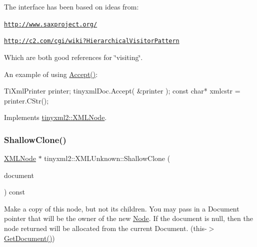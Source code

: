 The interface has been based on ideas from\+:


\begin{DoxyItemize}
\item \href{http://www.saxproject.org/}{\tt http\+://www.\+saxproject.\+org/}
\item \href{http://c2.com/cgi/wiki?HierarchicalVisitorPattern}{\tt http\+://c2.\+com/cgi/wiki?\+Hierarchical\+Visitor\+Pattern}
\end{DoxyItemize}

Which are both good references for \char`\"{}visiting\char`\"{}.

An example of using \hyperlink{classtinyxml2_1_1XMLUnknown_a8a06b8c82117ca969a432e17a46830fc}{Accept()}\+: \begin{DoxyVerb}TiXmlPrinter printer;
tinyxmlDoc.Accept( &printer );
const char* xmlcstr = printer.CStr();
\end{DoxyVerb}
 

Implements \hyperlink{classtinyxml2_1_1XMLNode_a81e66df0a44c67a7af17f3b77a152785}{tinyxml2\+::\+X\+M\+L\+Node}.

\mbox{\label{classtinyxml2_1_1XMLUnknown_ab73b48b819aa4b2ef3815dc2d7d20d5f}} 
\subsubsection{\texorpdfstring{Shallow\+Clone()}{ShallowClone()}\hspace{0.1cm}{\footnotesize\ttfamily [1/2]}}
{\footnotesize\ttfamily \hyperlink{classtinyxml2_1_1XMLNode}{X\+M\+L\+Node} $\ast$ tinyxml2\+::\+X\+M\+L\+Unknown\+::\+Shallow\+Clone (\begin{DoxyParamCaption}\item[{\hyperlink{classtinyxml2_1_1XMLDocument}{X\+M\+L\+Document} $\ast$}]{document }\end{DoxyParamCaption}) const\hspace{0.3cm}{\ttfamily [virtual]}}

Make a copy of this node, but not its children. You may pass in a Document pointer that will be the owner of the new \hyperlink{classNode}{Node}. If the \textquotesingle{}document\textquotesingle{} is null, then the node returned will be allocated from the current Document. (this-\/$>$\hyperlink{classtinyxml2_1_1XMLNode_af343d1ef0b45c0020e62d784d7e67a68}{Get\+Document()})

